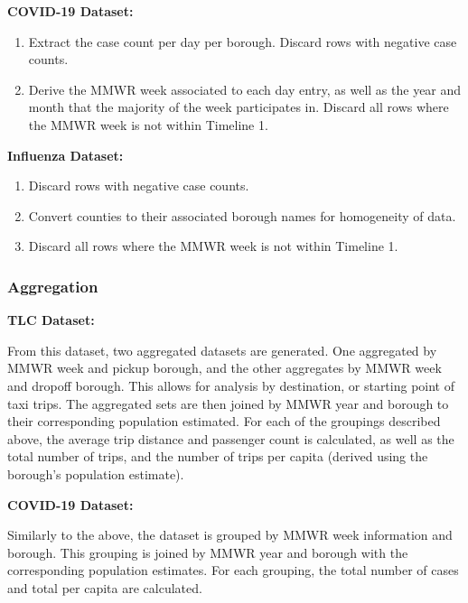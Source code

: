 \documentclass[11pt]{article}
\begin{document}
\textbf{COVID-19 Dataset:}
    \begin{enumerate}
        \item Extract the case count per day per borough. Discard rows with negative case counts.
        \item Derive the MMWR week associated to each day entry, as well as the year and month that the majority of the week participates in.
        Discard all rows where the MMWR week is not within Timeline 1.
    \end{enumerate}

\textbf{Influenza Dataset:}
    \begin{enumerate}
        \item Discard rows with negative case counts.
        \item Convert counties to their associated borough names for homogeneity of data.
        \item Discard all rows where the MMWR week is not within Timeline 1.
    \end{enumerate}

\subsubsection{Aggregation}

\textbf{TLC Dataset:}

From this dataset, two aggregated datasets are generated.
One aggregated by MMWR week and pickup borough, and the other aggregates by MMWR week and dropoff borough.
This allows for analysis by destination, or starting point of taxi trips.
The aggregated sets are then joined by MMWR year and borough to their corresponding population estimated.
For each of the groupings described above, 
the average trip distance and passenger count is calculated, 
as well as the total number of trips, and the number of trips per capita (derived using the borough's population estimate).

\textbf{COVID-19 Dataset:}

Similarly to the above, the dataset is grouped by MMWR week information and borough.
This grouping is joined by MMWR year and borough with the corresponding population estimates.
For each grouping, the total number of cases and total per capita are calculated.
\end{document}
